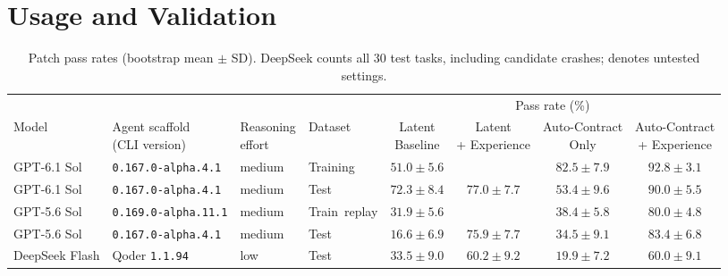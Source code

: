 \section{Usage and Validation}
\label{sec:usage}

\begin{table}[!t]
    \centering
    \caption{Patch pass rates (bootstrap mean $\pm$ SD). DeepSeek counts all 30 test tasks, including candidate crashes; \textemdash{} denotes untested settings.}
    \label{tab:tempoevo-main-evaluation}
    \small
    \setlength{\tabcolsep}{3pt}
    \begin{tabular*}{\textwidth}{@{\extracolsep{\fill}}llllcccc@{}}
        \toprule
        \multicolumn{4}{c}{} & \multicolumn{4}{c}{Pass rate (\%)} \\
        \cmidrule(lr){5-8}
        Model & \shortstack{Agent scaffold\\(CLI version)} & \shortstack{Reasoning\\effort}
        & Dataset & \shortstack{Latent\\Baseline}
        & \shortstack{Latent\\+ Experience}
        & \shortstack{Auto-Contract\\Only} & \shortstack{Auto-Contract\\+ Experience} \\
        \midrule
        GPT-6.1 Sol & \texttt{0.167.0-alpha.4.1} & medium & Training
        & $51.0 \pm 5.6$ & \textemdash{} & $82.5 \pm 7.9$ & {\boldmath$92.8 \pm 3.1$} \\
        GPT-6.1 Sol & \texttt{0.167.0-alpha.4.1} & medium & Test
        & $72.3 \pm 8.4$ & $77.0 \pm 7.7$ & $53.4 \pm 9.6$ & {\boldmath$90.0 \pm 5.5$} \\
        \addlinespace
        GPT-5.6 Sol & \texttt{0.169.0-alpha.11.1} & medium & \mbox{Train replay}
        & $31.9 \pm 5.6$ & \textemdash{} & $38.4 \pm 5.8$ & {\boldmath$80.0 \pm 4.8$} \\
        GPT-5.6 Sol & \texttt{0.167.0-alpha.4.1} & medium & Test
        & $16.6 \pm 6.9$ & $75.9 \pm 7.7$ & $34.5 \pm 9.1$ & {\boldmath$83.4 \pm 6.8$} \\
        \addlinespace
        DeepSeek Flash & Qoder \texttt{1.1.94} & low & Test
        & $33.5 \pm 9.0$ & {\boldmath$60.2 \pm 9.2$} & $19.9 \pm 7.2$ & {\boldmath$60.0 \pm 9.1$} \\
        \bottomrule
    \end{tabular*}
\end{table}

